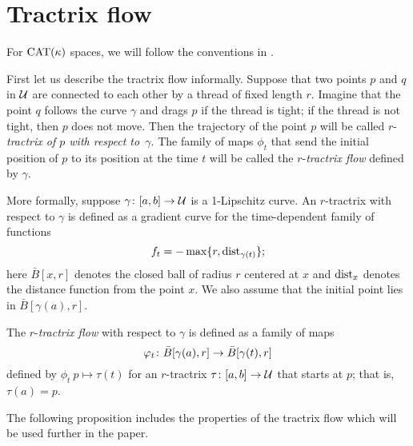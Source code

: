 \documentclass[oneside,a4paper, 12pt]{article}
\begin{document}
\section{Tractrix flow}\label{sec:Tractrix flow}

For $\mathrm{CAT}(\kappa)$ spaces, we will follow the conventions in \cite{akp}.

First let us describe the tractrix flow informally.
Suppose that two points $p$ and $q$ in ${\mathcal{U}}$ are connected to each other by a thread of fixed length $r$.
Imagine that the point $q$ follows the curve $\gamma$ and drags $p$ if the thread is tight; 
if the thread is not tight, then $p$ does not move.
Then the trajectory of the point $p$ will be called $r$-\emph{tractrix of $p$ with respect to~$\gamma$}.
The family of maps $\phi_t$ that send the initial position of $p$ to its position at the time $t$ will be called the $r$-\emph{tractrix flow} defined by $\gamma$.

More formally, suppose $\gamma\colon[a,b]\to \mathcal{U}$ is a 1-Lipschitz curve. 
An $r$-tractrix with respect to $\gamma$ is defined as a gradient curve for the time-dependent family of functions 
\[f_t=- \max\{r,\mathop{\rm dist}\nolimits_{\gamma(t)}\};\]
here $\bar B[x,r]$ denotes the closed ball of radius $r$ centered at $x$ and $\mathop{\rm dist}\nolimits_{x}$ denotes the distance function from the point $x$.
We also assume that the initial point lies in $\bar B[\gamma(a),r]$.

The $r$-\emph{tractrix flow} with respect to $\gamma$ is defined as a family of maps
\[\phi_t\:\bar B[\gamma(a),r]\z\to\bar B[\gamma(t),r]\]
defined by $\phi_t\:p\mapsto \tau(t)$
for an $r$-tractrix $\tau\colon[a,b]\to \mathcal{U}$ that starts at $p$; that is, $\tau(a)=p$.

The following proposition includes the properties of the tractrix flow which will be used further in the paper.
\end{document}
